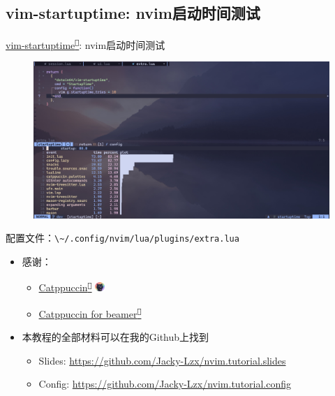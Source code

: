 \documentclass[aspectratio=169]{ctexbeamer}
\newcommand{\nerd}[1]{\texttt{#1}}
\newcommand{\link}[3][]{\href{#3}{#2\textsuperscript{\nerd{}}}}
\begin{document}
\subsection{vim-startuptime: nvim启动时间测试}
\begin{frame}{\link{vim-startuptime}{https://github.com/dstein64/vim-startuptime}: nvim启动时间测试}
  \begin{figure}[H]
    \centering
    \includegraphics[width=0.65\linewidth]{./Figures/StartupTime_Finish.jpg}
  \end{figure}
  配置文件：\lstinline[language={},style=path]{\~/.config/nvim/lua/plugins/extra.lua}
\end{frame}

\begin{frame}
  \begin{itemize}
    \item 感谢：
      \begin{itemize}
        \item \link{Catppuccin}{https://catppuccin.com/} \includegraphics[height=10pt]{./Figures/Catppuccin_logo.png}
        \item \link{Catppuccin for beamer}{https://github.com/atticus-sullivan/beamercolortheme}
      \end{itemize}
      \vspace{0.5cm}
    \item 本教程的全部材料可以在我的Github上找到
      \begin{itemize}
        \item Slides: \url{https://github.com/Jacky-Lzx/nvim.tutorial.slides}
        \item Config: \url{https://github.com/Jacky-Lzx/nvim.tutorial.config}
      \end{itemize}
  \end{itemize}
\end{frame}
\end{document}
